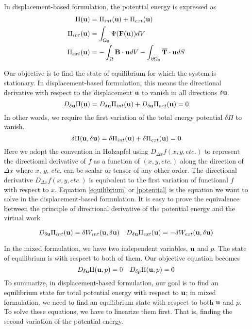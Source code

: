In displacement-based formulation, the potential energy is expressed as
\begin{subequations}
\begin{align}
\Pi(\bold{u}) &= \Pi_{int}(\bold{u}) + \Pi_{ext}(\bold{u}) \\
\Pi_{int}(\bold{u}) &= \int_{\Omega_{0}}\Psi(\bold{F}(\bold{u}))dV  \label{pint} \\
\Pi_{ext}(\bold{u}) &=  - \int_\Omega\bold{B}\cdot\bold{u}dV -  \int_{\partial{\Omega_0}}\overline{\bold{T}}\cdot{\bold{u}}dS
\label{pext} 
\end{align}
\end{subequations}

Our objective is to find the state of equilibrium for which the system is stationary. In displacement-based formulation, this means the directional derivative with respect to the displacement $\bold{u}$ to vanish in all directions $\delta{\bold{u}}$.
\begin{equation} \label{equilibrium}
D_{\delta\bold{u}}\Pi(\bold{u}) = D_{\delta\bold{u}}\Pi_{int}(\bold{u}) + D_{\delta\bold{u}}\Pi_{ext}(\bold{u}) = 0
\end{equation} 
In other words, we require the first variation of the total energy potential $\delta\Pi$ to vanish.
\begin{equation} \label{potential}
\delta\Pi(\bold{u}, \delta\bold{u}) =\delta\Pi_{int}(\bold{u}) + \delta\Pi_{ext}(\bold{u}) = 0
\end{equation}
Here we adopt the convention in Holzapfel using $D_{\Delta{x}}f(x, y, \textit{etc.})$ to represent the directional derivative of $f$ as a function of $(x, y, \textit{etc.})$ along the direction of $\Delta{x}$ where $x$, $y$, \textit{etc.} can be scalar or tensor of any other order. The directional derivative $D_{\Delta{x}}f(x, y, \textit{etc.})$ is equivalent to the first variation of functional $f$ with respect to $x$.
Equation \ref{equilibrium} or \ref{potential} is the equation we want to solve in the displacement-based formulation. It is easy to prove the equivalence between the principle of directional derivative of the potential energy and the virtual work

\begin{equation}
D_{\delta\bold{u}}\Pi_{int}(\bold{u}) = \delta W_{int}(\bold{u}, \delta\bold{u}) \quad
D_{\delta\bold{u}}\Pi_{ext}(\bold{u}) = - \delta W_{ext}(\bold{u}, \delta\bold{u})
\end{equation}

In the mixed formulation, we have two independent variables, $\bold{u}$ and $p$. The state of equilibrium is with respect to both of them. Our objective equation becomes
\begin{equation} \label{target}
D_{\delta\bold{u}}\Pi(\bold{u}, p) = 0 \quad D_{\delta{p}}\Pi(\bold{u}, p) = 0
\end{equation}
To summarize, in displacement-based formulation, our goal is to find an equilibrium state for total potential energy with respect to $\bold{u}$; in mixed formulation, we need to find an equilibrium state with respect to both $\bold{u}$ and $p$. To solve these equations, we have to linearize them first. That is, finding the second variation of the potential energy.


